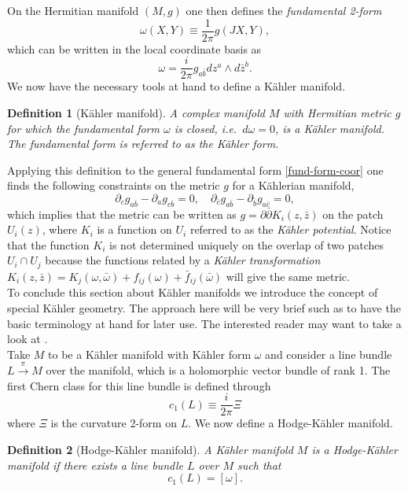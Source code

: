 \documentclass[12pt,twoside]{book}
\newtheorem{definition}{Definition}[chapter]
\begin{document}
On the Hermitian manifold $(M,g)$ one then defines the \emph{fundamental 2-form}
\begin{equation}
\omega(X,Y)\equiv\frac{1}{2\pi}g(JX,Y),
\end{equation}which can be written in the local coordinate basis as \cite{nakaharaGeo}
\begin{equation}\label{fund-form-coor}
\omega=\frac{i}{2\pi}g_{a\bar{b}} dz^{a}\wedge d\bar{z}^{b}.
\end{equation}We now have the necessary tools at hand to define a K\"ahler manifold.

\begin{definition}[K\"ahler manifold]
A complex manifold $M$ with Hermitian metric $g$ for which the fundamental form $\omega$ is closed, i.e.\ $d\omega=0$, is a K\"ahler manifold. The fundamental form is referred to as the K\"ahler form.
\end{definition}
Applying this definition to the general fundamental form \eqref{fund-form-coor} one finds the following constraints on the metric $g$ for a K\"ahlerian manifold,
\begin{equation}
\partial_{c}g_{a\bar{b}}-\partial_{a}g_{c\bar{b}}=0,\quad \partial_{\bar{c}}g_{a\bar{b}}-\partial_{\bar{b}}g_{a\bar{c}}=0,
\end{equation}which implies that the metric can be written as $g = \partial \bar{\partial}K_{i}(z,\bar{z})$ on the patch $U_{i}(z)$, where $K_{i}$ is a function on $U_{i}$ referred to as the \emph{K\"ahler potential}. Notice that the function $K_{i}$ is not determined uniquely on the overlap of two patches $U_{i}\cap U_{j}$ because the functions related by a \emph{K\"ahler transformation} $K_{i}(z,\bar{z}) = K_{j}(\omega,\bar{\omega}) + f_{ij}(\omega)+\bar{f}_{ij}(\bar{\omega})$ will give the same metric.\\

To conclude this section about K\"ahler manifolds we introduce the concept of special K\"ahler geometry. The approach here will be very brief such as to have the basic terminology at hand for later use. The interested reader may want to take a look at \cite{strom:special1990,Craps:1997kx,Fre:1996qr}.\\

Take $M$ to be a K\"ahler manifold with K\"ahler form $\omega$ and consider a line bundle $L\overset{\pi}{\longrightarrow}M$ over the manifold, which is a holomorphic vector bundle of rank 1. The first Chern class for this line bundle is defined through
\begin{equation}
c_{1}(L)\equiv\frac{i}{2\pi}\Xi
\end{equation}where $\Xi$ is the curvature 2-form on $L$. We now define a Hodge-K\"ahler manifold.
\begin{definition}[Hodge-K\"ahler manifold]
A K\"ahler manifold $M$ is a Hodge-K\"ahler manifold if there exists a line bundle $L$ over $M$ such that
\begin{equation}
c_{1}(L)=[\omega].
\end{equation}\end{definition}
\end{document}
